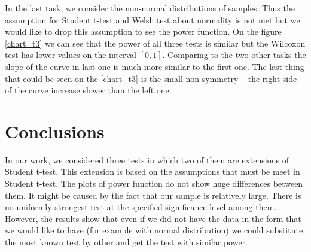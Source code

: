 \documentclass{article}
\begin{document}
In the last task, we consider the non-normal distributions of samples. Thus the assumption for Student t-test and Welsh test about normality is not met but we would like to drop this assumption to see the power function. On the figure \ref{chart_t3} we can see that the power of all three tests is similar but the Wilcoxon test has lower values on the interval $[0,1]$. Comparing to the two other tasks the slope of the curve in last one is much more similar to the first one. The last thing that could be seen on the \ref{chart_t3} is the small non-symmetry -- the right side of the curve increase slower than the left one. 

\section{Conclusions}
In our work, we considered three tests in which two of them are extensions of Student t-test. This extension is based on the assumptions that must be meet in Student t-test. The plots of power function do not show huge differences between them. It might be caused by the fact that our sample is relatively large. There is no uniformly strongest test at the specified significance level among them. However, the results show that even if we did not have the data in the form that we would like to have (for example with normal distribution) we could substitute the most known test by other and get the test with similar power.
\end{document}
